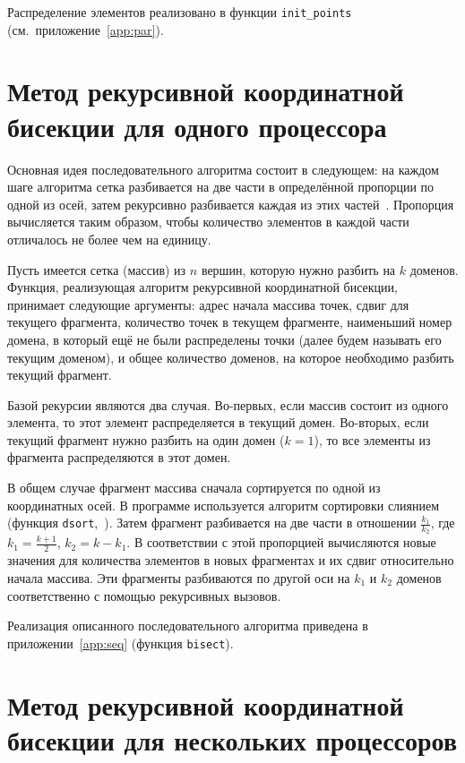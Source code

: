 \documentclass[oneside,final,14pt]{extreport}
\begin{document}
Распределение элементов реализовано в функции \texttt{init\_points}
(см.~приложение~\ref{app:par}).

\section*{Метод рекурсивной координатной бисекции для одного процессора}

Основная идея последовательного алгоритма состоит в следующем: на каждом
шаге алгоритма сетка разбивается на две части в определённой пропорции по
одной из осей, затем рекурсивно разбивается каждая из этих частей~\cite{baraban}.
Пропорция вычисляется таким образом, чтобы количество элементов в каждой
части отличалось не более чем на единицу.

Пусть имеется сетка (массив) из $n$ вершин, которую нужно разбить на $k$ доменов.
Функция, реализующая алгоритм рекурсивной координатной бисекции, принимает
следующие аргументы: адрес начала массива точек, сдвиг для текущего фрагмента,
количество точек в текущем фрагменте, наименьший номер домена, в который ещё
не были распределены точки (далее будем называть его текущим доменом),
и общее количество доменов, на которое необходимо разбить текущий фрагмент.

Базой рекурсии являются два случая. Во-первых, если массив состоит из одного
элемента, то этот элемент распределяется в текущий домен. Во-вторых,
если текущий фрагмент нужно разбить на один домен ($k = 1$), то все
элементы из фрагмента распределяются в этот домен.

В общем случае фрагмент массива сначала сортируется по одной из координатных
осей. В программе используется алгоритм сортировки слиянием (функция
\texttt{dsort},~\cite{sortbaraban}). Затем фрагмент разбивается на две части
в отношении
$\frac{k_1}{k_2}$, где $k_1 = \frac{k + 1}{2}$, $k_2 = k - k_1$.
В соответствии с этой пропорцией вычисляются новые значения для количества
элементов в новых фрагментах и их сдвиг относительно начала массива.
Эти фрагменты разбиваются по другой оси на $k_1$ и $k_2$ доменов соответственно
с помощью рекурсивных вызовов.

Реализация описанного последовательного алгоритма приведена в
приложении~\ref{app:seq} (функция \texttt{bisect}).

\section*{Метод рекурсивной координатной бисекции для нескольких процессоров}
\end{document}
